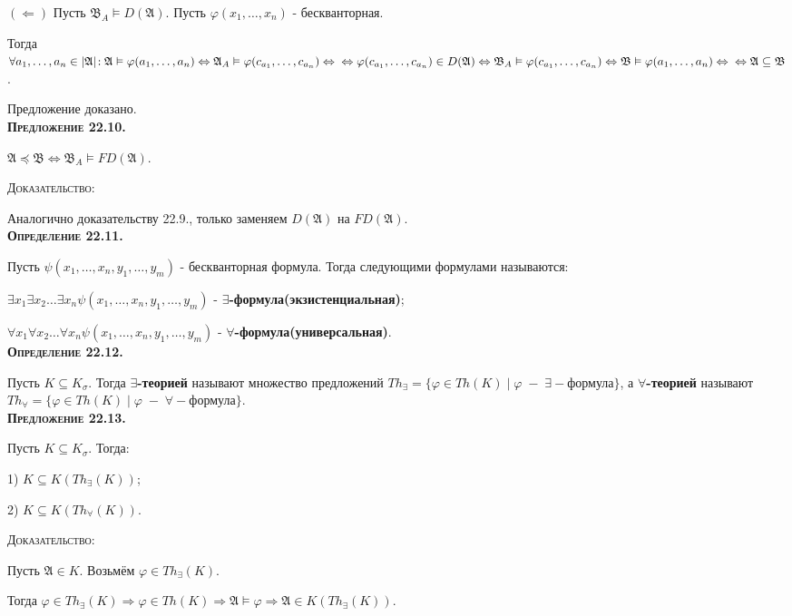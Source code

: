 \documentclass[18pt, a4paper]{extarticle}
\newcommand{\opred}[1]{\textbf{\textsc{Определение #1}}}
\newcommand{\predl}[1]{\textbf{\textsc{Предложение #1}}}
\newcommand{\vp}{\varphi}
\newcommand{\vD}{\vDash}
\newcommand{\sg}{\sigma}
\newcommand{\leftdok}{\boxed{(\Leftarrow)}}
\newcommand{\mA}{\mathfrak{A}}
\newcommand{\mB}{\mathfrak{B}}
\newcommand{\dok}{\textsc{Доказательство:}}
\begin{document}
$\leftdok$ Пусть $\mB_A\vD D(\mA)$. Пусть $\vp(x_1,\dots,x_n)$ - бескванторная.

Тогда $\forall a_1,\dots,a_n\in|\mA|\!:\mA\vD\vp(a_1,\dots,a_n)\Leftrightarrow\mA_A\vD\vp(c_{a_1},\dots,c_{a_n})\Leftrightarrow\newline \Leftrightarrow\vp(c_{a_1},\dots,c_{a_n})\in D(\mA)\Leftrightarrow\mB_A\vD\vp(c_{a_1},\dots,c_{a_n})\Leftrightarrow\mB\vD\vp(a_1,\dots,a_n)\Leftrightarrow\newline \Leftrightarrow\mA\subseteq\mB$.

Предложение доказано.\\

\predl {22.10.} 

$\mA\preccurlyeq\mB\Leftrightarrow\mB_A\vD FD(\mA)$.

\dok

Аналогично доказательству 22.9., только заменяем $D(\mA)$ на $FD(\mA)$.\\ 

\opred {22.11.} 

Пусть $\psi(x_1,\dots,x_n, y_1,\dots,y_m)$ - бескванторная формула. Тогда следующими формулами называются:

$\exists x_1\exists x_2\dots\exists x_n\psi(x_1,\dots,x_n, y_1,\dots,y_m)$ - \textbf{$\exists$-формула(экзистенциальная)};

$\forall x_1\forall x_2\dots\forall x_n\psi(x_1,\dots,x_n, y_1,\dots,y_m)$ - \textbf{$\forall$-формула(универсальная)}.\\

\opred {22.12.} 

Пусть $K\subseteq K_\sg$. Тогда \textbf{$\exists$-теорией} называют множество предложений $Th_\exists=\{\vp\in Th(K)\;|\;\vp\;-\;\exists\!-\!\text{формула}\}$, а \textbf{$\forall$-теорией} называют\\$Th_\forall=\{\vp\in Th(K)\;|\;\vp\;-\;\forall\!-\!\text{формула}\}$.\\

\predl {22.13.} 

Пусть $K\subseteq K_\sg$. Тогда:

1) $K\subseteq K(Th_\exists(K))$;

2) $K\subseteq K(Th_\forall(K))$.

\dok

Пусть $\mA\in K$. Возьмём $\vp\in Th_\exists(K)$. 

Тогда $\vp\in Th_\exists(K)\Rightarrow\vp\in Th(K)\Rightarrow\mA\vD\vp\Rightarrow\mA\in K(Th_\exists(K))$.
\end{document}
